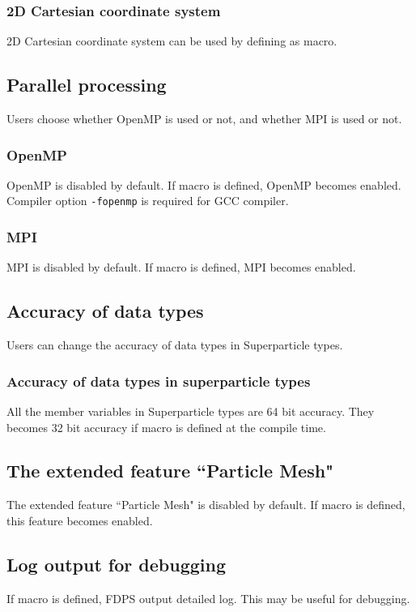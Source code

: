 \subsubsection{2D Cartesian coordinate system}
2D Cartesian coordinate system can be used by defining  as macro.

\subsection{Parallel processing}
\label{subsec:macro_parallel}
Users choose whether OpenMP is used or not, and whether MPI is used or not.

\subsubsection{OpenMP}
OpenMP is disabled by default. If macro  is defined, OpenMP becomes enabled. Compiler option \texttt{-fopenmp} is required for GCC compiler.

\subsubsection{MPI}
MPI is disabled by default. If macro  is defined, MPI becomes enabled.

\subsection{Accuracy of data types}
\label{subsec:macro_FP_accuracy}
Users can change the accuracy of data types in Superparticle types.

\subsubsection{Accuracy of data types in superparticle types}
All the member variables in Superparticle types are 64 bit accuracy. They becomes 32 bit accuracy if macro  is defined at the compile time.

\subsection{The extended feature ``Particle Mesh"}
\label{subsec:macro_PM}
The extended feature ``Particle Mesh" is disabled by default. If macro  is defined, this feature becomes enabled.

\subsection{Log output for debugging}
\label{subsec:macro_debug}
If macro  is defined, FDPS output detailed log. This may be useful for debugging.
